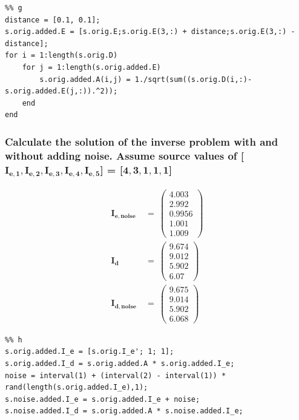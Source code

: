 \begin{lstlisting}
%% g
distance = [0.1, 0.1];
s.orig.added.E = [s.orig.E;s.orig.E(3,:) + distance;s.orig.E(3,:) - distance];
for i = 1:length(s.orig.D)
    for j = 1:length(s.orig.added.E)
        s.orig.added.A(i,j) = 1./sqrt(sum((s.orig.D(i,:)-s.orig.added.E(j,:)).^2));
    end
end
\end{lstlisting}




\clearpage
\subsubsection{Calculate the solution of the inverse problem with and without adding noise. Assume
source values of  [$\mathbf{I_{e,1}, I_{e,2}, I_{e,3},I_{e,4},I_{e,5}}$] = [$\mathbf{4, 3, 1, 1, 1}$]}

\begin{align}
\mathbf{I_{e,noise}}\ &=\ \left(\begin{array}{c} 4.003\\ 2.992\\ 0.9956\\ 1.001\\ 1.009 \end{array}\right)\\
   \mathbf{I_d}\ &=\ \left(\begin{array}{c} 9.674\\ 9.012\\ 5.902\\ 6.07 \end{array}\right)\\
   \mathbf{I_{d,noise}}\ &=\ \left(\begin{array}{c} 9.675\\ 9.014\\ 5.902\\ 6.068 \end{array}\right)
\end{align}
\begin{lstlisting}
%% h
s.orig.added.I_e = [s.orig.I_e'; 1; 1];
s.orig.added.I_d = s.orig.added.A * s.orig.added.I_e;
noise = interval(1) + (interval(2) - interval(1)) * rand(length(s.orig.added.I_e),1);
s.noise.added.I_e = s.orig.added.I_e + noise;
s.noise.added.I_d = s.orig.added.A * s.noise.added.I_e;
\end{lstlisting}




\clearpage
